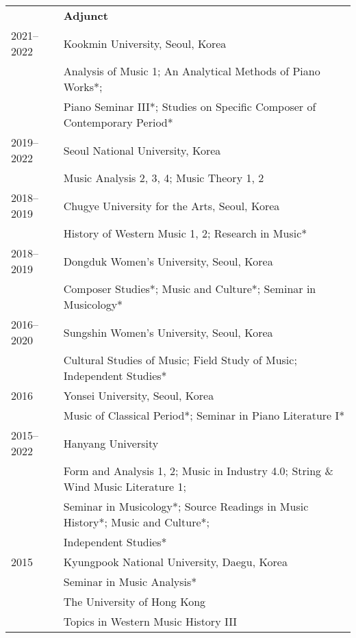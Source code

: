 \documentclass[a4paper,11pt,draft]{article}
\begin{document}
  \vspace{5.0mm}
  \hspace*{-0.77cm}
  \begin{tabular}{p{2.5cm} l}
    & \textbf{Adjunct}\\
    2021–2022 & Kookmin University, Seoul, Korea\\
    & Analysis of Music 1; An Analytical Methods of Piano Works*;\\
    & Piano Seminar III*; Studies on Specific Composer of Contemporary Period*\\[1mm]
    
    2019–2022 & Seoul National University, Korea\\
    & Music Analysis 2, 3, 4; Music Theory 1, 2\\[1mm]
    
    2018–2019 & Chugye University for the Arts, Seoul, Korea\\
    & History of Western Music 1, 2; Research in Music*\\[1mm]
    
    2018–2019 & Dongduk Women's University, Seoul, Korea\\
    & Composer Studies*; Music and Culture*; Seminar in Musicology*\\[1mm]
    
    2016–2020 & Sungshin Women's University, Seoul, Korea\\
    & Cultural Studies of Music; Field Study of Music; Independent Studies*\\[1mm]
    
    2016 & Yonsei University, Seoul, Korea\\
    & Music of Classical Period*; Seminar in Piano Literature I*\\[1mm]
    
    2015–2022 & Hanyang University\\
    & Form and Analysis 1, 2; Music in Industry 4.0; String \& Wind Music Literature 1;\\
    & Seminar in Musicology*; Source Readings in Music History*; Music and Culture*;\\
    & Independent Studies*\\[1mm]
    
    2015 & Kyungpook National University, Daegu, Korea\\
    & Seminar in Music Analysis*\\[1mm]
    
    & The University of Hong Kong\\
    & Topics in Western Music History III\\[1mm]
    

\end{tabular}
\end{document}
